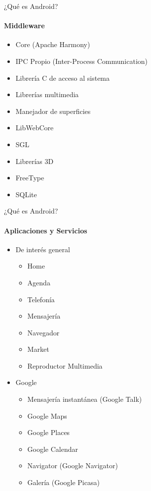 \documentclass[12pt]{beamer}
\begin{document}
\begin{frame}{¿Qué es Android?}
    \framesubtitle{Middleware}
    \begin{itemize}
        \item Core (Apache Harmony)
        \item IPC Propio (Inter-Process Communication)
        \item Librería C de acceso al sistema
        \item Librerías multimedia
        \item Manejador de superficies
        \item LibWebCore
        \item SGL
        \item Librerías 3D
        \item FreeType
        \item SQLite
    \end{itemize}
\end{frame}

\begin{frame}{¿Qué es Android?}
    \framesubtitle{Aplicaciones y Servicios}
    \begin{itemize}
        \item De interés general
        \begin{itemize}
            \item Home
            \item Agenda
            \item Telefonía
            \item Mensajería
            \item Navegador
            \item Market
            \item Reproductor Multimedia
        \end{itemize}
        \item Google
        \begin{itemize}
            \item Mensajería instantánea (Google Talk)
            \item Google Maps
            \item Google Places
            \item Google Calendar
            \item Navigator (Google Navigator)
            \item Galería (Google Picasa)
        \end{itemize}
    \end{itemize}
\end{frame}
\end{document}
